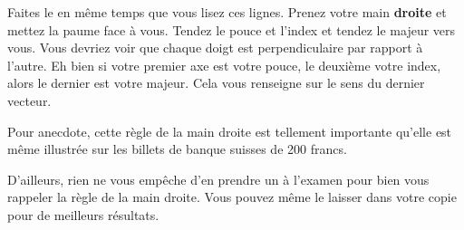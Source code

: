 \documentclass{article}
\begin{document}
\noindent\begin{minipage}{0.85\textwidth}
\setlength{\parindent}{0.5cm}
 Faites le en même temps que vous lisez ces lignes. Prenez votre main \textbf{droite} et mettez la paume face à vous. Tendez le pouce et l'index et tendez le majeur vers vous. Vous devriez voir que chaque doigt est perpendiculaire par rapport à l'autre. Eh bien si votre premier axe est votre pouce, le deuxième votre index, alors le dernier est votre majeur. Cela vous renseigne sur le sens du dernier vecteur. 

Pour anecdote, cette règle de la main droite est tellement importante qu'elle est même illustrée sur les billets de banque suisses de 200 francs. 

D'ailleurs, rien ne vous empêche d'en prendre un à l'examen pour bien vous rappeler la règle de la main droite. Vous pouvez même le laisser dans votre copie pour de meilleurs résultats.


\end{minipage}
\end{document}
